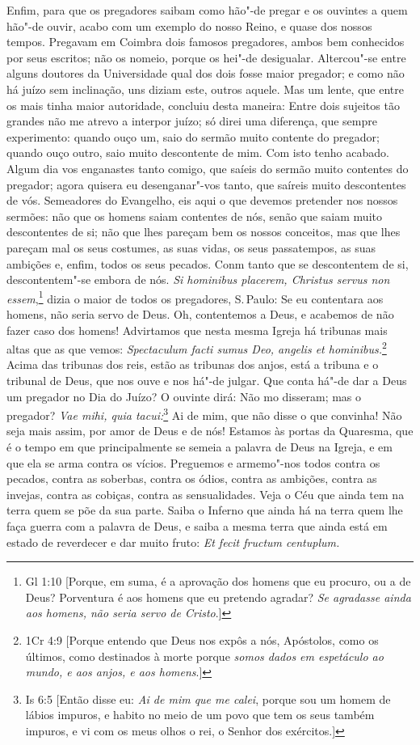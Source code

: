 Enfim, para que os pregadores saibam como hão"-de pregar e os ouvintes a
quem hão"-de ouvir, acabo com um exemplo do nosso Reino, e quase dos
nossos tempos. Pregavam em Coimbra dois famosos pregadores, ambos bem
conhecidos por seus escritos; não os nomeio, porque os hei"-de
desigualar. Altercou"-se entre alguns doutores da Universidade qual dos
dois fosse maior pregador; e como não há juízo sem inclinação, uns
diziam este, outros aquele. Mas um lente, que entre os mais tinha maior
autoridade, concluiu desta maneira: Entre dois sujeitos tão grandes
não me atrevo a interpor juízo; só direi uma diferença, que sempre experimento: quando ouço um, saio do sermão muito contente do pregador;
quando ouço outro, saio muito descontente de mim.
Com isto tenho acabado. Algum dia vos enganastes tanto comigo, que
saíeis do sermão muito contentes do pregador; agora quisera eu
desenganar"-vos tanto, que saíreis muito descontentes
de vós. Semeadores do Evangelho, eis aqui o que devemos pretender nos
nossos sermões: não que os homens saiam contentes de nós, senão que
saiam muito descontentes de si; não que lhes pareçam bem os nossos
conceitos, mas que lhes pareçam mal os seus costumes, as suas vidas, os
seus passatempos, as suas ambições e, enfim, todos os seus pecados. Conm
tanto que se descontentem de si, descontentem"-se embora de nós. \emph{Si
hominibus placerem, Christus servus non essem},\footnote{Gl 1:10 [Porque, em suma, é a aprovação dos homens que eu procuro, ou a de Deus? Porventura é aos homens que eu pretendo agradar? \emph{Se agradasse ainda aos homens, não seria servo de Cristo}.]} dizia o maior de
todos os pregadores, S.\,Paulo: Se eu contentara aos homens, não seria
servo de Deus. Oh, contentemos a Deus, e acabemos de não fazer caso
dos homens! Advirtamos que nesta mesma Igreja há tribunas mais altas
que as que vemos: \emph{Spectaculum facti sumus Deo, angelis et hominibus.}\footnote{1Cr 4:9 [Porque entendo que Deus nos expôs a nós, Apóstolos, como os últimos, como destinados
à morte porque \emph{somos dados em espetáculo ao mundo, e aos anjos, e aos homens}.]} Acima das tribunas dos reis, estão as tribunas dos anjos, está
a tribuna e o tribunal de Deus, que nos ouve e nos há"-de julgar. Que
conta há"-de dar a Deus um pregador no Dia do Juízo? O ouvinte dirá:
Não mo disseram; mas o pregador? \emph{Vae mihi, quia tacui:}\footnote{Is 6:5 [Então disse eu: \emph{Ai de mim que me calei}, porque sou um homem de lábios impuros, e habito
no meio de um povo que tem os seus também impuros, e vi com os meus olhos o rei, o Senhor dos exércitos.]} Ai
de mim, que não disse o que convinha! Não seja mais assim, por amor de
Deus e de nós!
Estamos às portas da Quaresma, que é o tempo em que principalmente se
semeia a palavra de Deus na Igreja, e em que ela se arma contra os
vícios. Preguemos e armemo"-nos todos contra os pecados, contra as
soberbas, contra os ódios, contra as ambições, contra as invejas, contra
as cobiças, contra as sensualidades. Veja o Céu que ainda tem na terra
quem se põe da sua parte. Saiba o Inferno que ainda há na terra quem lhe
faça guerra com a palavra de Deus, e saiba a mesma terra que ainda
está em estado de reverdecer e dar muito fruto: \emph{Et fecit fructum
centuplum.}


